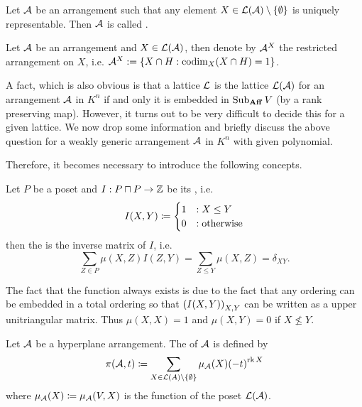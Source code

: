 \begin{definition}
    Let $\mathcal{A}$ be an arrangement such that any element $X\in\cL(\cA)\setminus\set{\emptyset}$ is uniquely representable. Then $\mathcal{A}$ is called .
\end{definition}

\begin{definition}
    Let $\mathcal{A}$ be an arrangement and $X\in\mathcal{L}(\mathcal{A})$, then denote by $\mathcal{A}^X$ the restricted arrangement on $X$, i.e. $\cA^X:=\set{X\setmeet H}[\codim_X(X\setmeet H)=1]$.
\end{definition}

A fact, which is also obvious is that a lattice $\mathcal{L}$ is the lattice $\mathcal{L}(\mathcal{A})$ for an arrangement $\mathcal{A}$ in $K^n$ if and only it is embedded in $\mathop{\mathrm{Sub}}\nolimits_{\mathbf{Aff}}V$ (by a rank preserving map). However, it turns out to be very difficult to decide this for a given lattice.
We now drop some information and briefly discuss the above question for a weakly generic arrangement $\mathcal{A}$ in $K^n$ with given  polynomial.

Therefore, it becomes necessary to introduce the following concepts.

\begin{definition}
    Let $P$ be a poset and $I:P\setprod P\to \ints$ be its , i.e.
    $$
    I(X,Y)\mathrel{\mathrel{\mathop:}\mkern-1.2mu=}
    \begin{cases}
        1 &: X\leq Y\\
        0 &:\textrm{otherwise}
    \end{cases}
    $$
    then the  is the inverse matrix of $I$, i.e.
    $$
    \sum_{Z\in P}{\mu(X,Z)I(Z,Y)}=\sum_{Z\leq Y}{\mu(X,Z)}=\delta_{XY}.
    $$
\end{definition}

\begin{remark}
    The fact that the  function always exists is due to the fact that any ordering can be embedded in a total ordering so that $\seq{I(X,Y)}_{X,Y}$ can be written as a upper unitriangular matrix. Thus $\mu(X,X)=1$ and $\mu(X,Y)=0$ if $X\not\leq Y$.
\end{remark}

\begin{definition}
    Let $\mathcal{A}$ be a hyperplane arrangement. The  of $\mathcal{A}$ is defined by
    $$
    \pi(\cA,t)\defeq\sum_{X\in\cL(A)\setminus\set{\emptyset}}{\mu_{\cA}(X){(-t)}^{\rk X}}
    $$
    where $\mu_{\mathcal{A}}(X)\mathrel{\mathrel{\mathop:}\mkern-1.2mu=}\mu_{\mathcal{A}}(V,X)$ is the  function of the poset $\mathcal{L}(\mathcal{A})$.
\end{definition}


